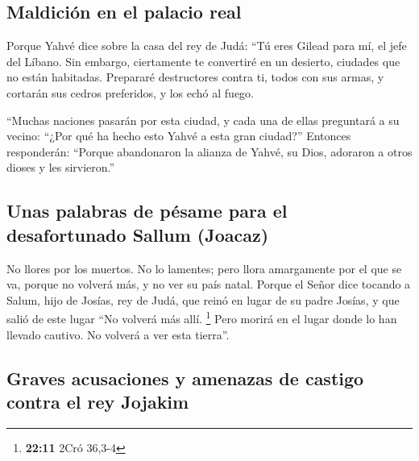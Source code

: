 \begin{paracol}{2}
\hypertarget{maldiciuxf3n-en-el-palacio-real}{%
\subsection{Maldición en el palacio
real}\label{maldiciuxf3n-en-el-palacio-real}}

 Porque Yahvé dice sobre la casa del rey de Judá: ``Tú
eres Gilead para mí, el jefe del Líbano. Sin embargo, ciertamente te
convertiré en un desierto, ciudades que no están habitadas.
 Prepararé destructores contra ti, todos con sus armas, y
cortarán sus cedros preferidos, y los echó al fuego.

 ``Muchas naciones pasarán por esta ciudad, y cada una de
ellas preguntará a su vecino: ``¿Por qué ha hecho esto Yahvé a esta gran
ciudad?''  Entonces responderán: ``Porque abandonaron la
alianza de Yahvé, su Dios, adoraron a otros dioses y les sirvieron.''

\hypertarget{unas-palabras-de-puxe9same-para-el-desafortunado-sallum-joacaz}{%
\subsection{Unas palabras de pésame para el desafortunado Sallum
(Joacaz)}\label{unas-palabras-de-puxe9same-para-el-desafortunado-sallum-joacaz}}

 No llores por los muertos. No lo lamentes; pero llora
amargamente por el que se va, porque no volverá más, y no ver su país
natal.  Porque el Señor dice tocando a Salum, hijo de
Josías, rey de Judá, que reinó en lugar de su padre Josías, y que salió
de este lugar ``No volverá más allí. \footnote{\textbf{22:11} 2Cró
  36,3-4}  Pero morirá en el lugar donde lo han llevado
cautivo. No volverá a ver esta tierra''.

\hypertarget{graves-acusaciones-y-amenazas-de-castigo-contra-el-rey-jojakim}{%
\subsection{Graves acusaciones y amenazas de castigo contra el rey
Jojakim}\label{graves-acusaciones-y-amenazas-de-castigo-contra-el-rey-jojakim}}


\end{paracol}

